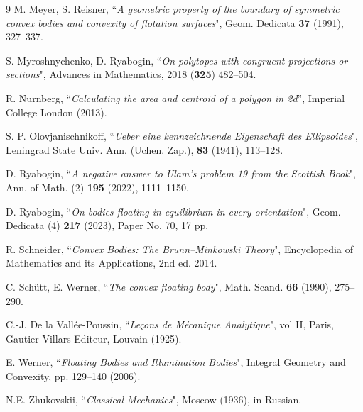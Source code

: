 \documentclass[12pt,letterpaper,reqno]{amsart}
\begin{document}
\begin{thebibliography}{9}
M. Meyer, S. Reisner, ``\textit{A geometric property of the boundary of symmetric convex bodies and convexity of flotation surfaces}", Geom. Dedicata \textbf{37} (1991), 327–337.

S. Myroshnychenko, D. Ryabogin, “\textit{On polytopes with congruent projections or sections}", Advances in Mathematics, 2018 (\textbf{325}) 482--504.

R. Nurnberg, ``\textit{Calculating the area and centroid of a polygon in 2d}'', Imperial College London (2013).

S. P. Olovjanischnikoff, ``\textit{Ueber eine kennzeichnende Eigenschaft des Ellipsoides}", Leningrad State Univ. Ann. (Uchen. Zap.), \textbf{83} (1941), 113--128.

D. Ryabogin, ``\textit{A negative answer to Ulam’s problem 19 from the Scottish Book}", Ann. of Math. (2) \textbf{195} (2022), 1111--1150.

D. Ryabogin, ``\textit{On bodies floating in equilibrium in every orientation}", Geom. Dedicata (4) \textbf{217} (2023), Paper No. 70, 17 pp.


R. Schneider, ``\textit{Convex Bodies: The Brunn–Minkowski Theory}", Encyclopedia of Mathematics and its Applications, 2nd ed. 2014.

C. Sch\"utt, E. Werner, ``\textit{The convex floating body}", Math. Scand. \textbf{66} (1990), 275--290.

C.-J. De la Vallée-Poussin, ``\textit{Leçons de Mécanique Analytique}", vol II, Paris, Gautier Villars Editeur, Louvain (1925).

E. Werner, ``\textit{Floating Bodies and Illumination Bodies}", Integral Geometry and Convexity, pp. 129--140 (2006).

N.E. Zhukovskii, ``\textit{Classical Mechanics}", Moscow (1936), in Russian.
\end{thebibliography}
\end{document}
